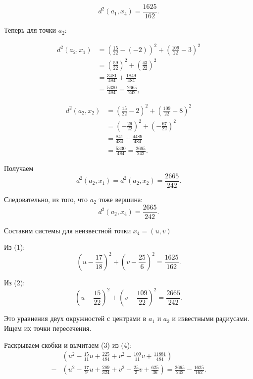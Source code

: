 \documentclass[pract]{SCWorks}
\begin{document}
    \begin{equation}
    d^2(a_1,x_4) = \frac{1625}{162}.
    \end{equation}

    Теперь для точки $a_2$:

    \[
    \begin{aligned}
    d^2(a_2,x_1) &= \left(\frac{15}{22} - (-2)\right)^2 + \left(\frac{109}{22} - 3\right)^2 \\
    &= \left(\frac{59}{22}\right)^2 + \left(\frac{43}{22}\right)^2 \\
    &= \frac{3481}{484} + \frac{1849}{484} \\
    &= \frac{5330}{484} = \frac{2665}{242},
    \end{aligned}
    \]

    \[
    \begin{aligned}
    d^2(a_2,x_2) &= \left(\frac{15}{22} - 2\right)^2 + \left(\frac{109}{22} - 8\right)^2 \\
    &= \left(-\frac{29}{22}\right)^2 + \left(-\frac{67}{22}\right)^2 \\
    &= \frac{841}{484} + \frac{4489}{484} \\
    &= \frac{5330}{484} = \frac{2665}{242}.
    \end{aligned}
    \]

    Получаем
    \[
    d^2(a_2,x_1) = d^2(a_2,x_2) = \frac{2665}{242}.
    \]

    Следовательно, из того, что $a_2$ тоже вершина:
    \begin{equation}
    d^2(a_2,x_4) = \frac{2665}{242}.
    \end{equation}

    Составим системы для неизвестной точки $x_4=(u,v)$

    Из (1):
    \begin{equation}
    \left(u - \frac{17}{18}\right)^2 + \left(v - \frac{25}{6}\right)^2 = \frac{1625}{162}.
    \end{equation}

    Из (2):
    \begin{equation}
    \left(u - \frac{15}{22}\right)^2 + \left(v - \frac{109}{22}\right)^2 = \frac{2665}{242}.
    \end{equation}

    Это уравнения двух окружностей с центрами в $a_1$ и $a_2$ и известными радиусами.
    Ищем их точки пересечения.

    Раскрываем скобки и вычитаем (3) из (4):
    \[
    \begin{aligned}
    &\left(u^2 - \frac{15}{11}u + \frac{225}{484} + v^2 - \frac{109}{11}v + \frac{11881}{484}\right) \\
    - &\left(u^2 - \frac{17}{9}u + \frac{289}{324} + v^2 - \frac{25}{3}v + \frac{625}{36}\right) = \frac{2665}{242} - \frac{1625}{162}.
    \end{aligned}
    \]
\end{document}
